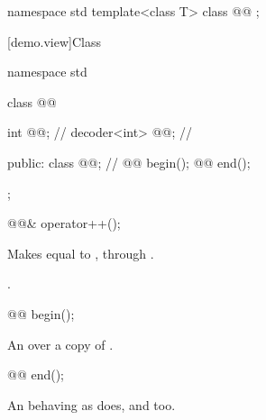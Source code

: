 \begin{codeblock}
namespace std {
  template<class T>
  class @@ {};
}
\end{codeblock}

[demo.view]{Class }

\begin{codeblock}
namespace std {
  class @@ {
    int @@;            // \expos
    decoder<int> @@; // \expos

  public:
    class @@; // \expos
    @@ begin();
    @@ end();
  };
}
\end{codeblock}

%
\begin{itemdecl}
@@& operator++();
\end{itemdecl}

\begin{itemdescr}
\pnum
\effects
Makes  equal to , through .

\pnum
\returns
{}.
\end{itemdescr}

%
\begin{itemdecl}
@@ begin();
\end{itemdecl}

\begin{itemdescr}
\pnum
\returns
An  over a copy of .
\end{itemdescr}

%
\begin{itemdecl}
@@ end();
\end{itemdecl}

\begin{itemdescr}
\pnum
\returns
An  behaving as  does, and  too.
\end{itemdescr}
